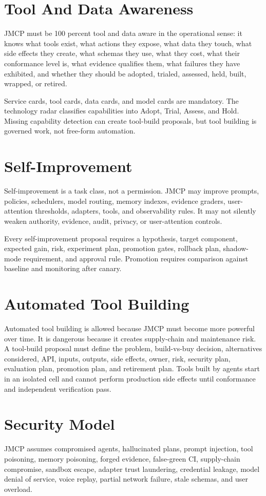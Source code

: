 \documentclass[10pt,journal,onecolumn]{IEEEtran}
\begin{document}
\section{Tool And Data Awareness}
JMCP must be 100 percent tool and data aware in the operational sense: it knows what tools exist, what actions they expose, what data they touch, what side effects they create, what schemas they use, what they cost, what their conformance level is, what evidence qualifies them, what failures they have exhibited, and whether they should be adopted, trialed, assessed, held, built, wrapped, or retired.

Service cards, tool cards, data cards, and model cards are mandatory. The technology radar classifies capabilities into Adopt, Trial, Assess, and Hold. Missing capability detection can create tool-build proposals, but tool building is governed work, not free-form automation.

\section{Self-Improvement}
Self-improvement is a task class, not a permission. JMCP may improve prompts, policies, schedulers, model routing, memory indexes, evidence graders, user-attention thresholds, adapters, tools, and observability rules. It may not silently weaken authority, evidence, audit, privacy, or user-attention controls.

Every self-improvement proposal requires a hypothesis, target component, expected gain, risk, experiment plan, promotion gates, rollback plan, shadow-mode requirement, and approval rule. Promotion requires comparison against baseline and monitoring after canary.

\section{Automated Tool Building}
Automated tool building is allowed because JMCP must become more powerful over time. It is dangerous because it creates supply-chain and maintenance risk. A tool-build proposal must define the problem, build-vs-buy decision, alternatives considered, API, inputs, outputs, side effects, owner, risk, security plan, evaluation plan, promotion plan, and retirement plan. Tools built by agents start in an isolated cell and cannot perform production side effects until conformance and independent verification pass.

\section{Security Model}
JMCP assumes compromised agents, hallucinated plans, prompt injection, tool poisoning, memory poisoning, forged evidence, false-green CI, supply-chain compromise, sandbox escape, adapter trust laundering, credential leakage, model denial of service, voice replay, partial network failure, stale schemas, and user overload.
\end{document}
